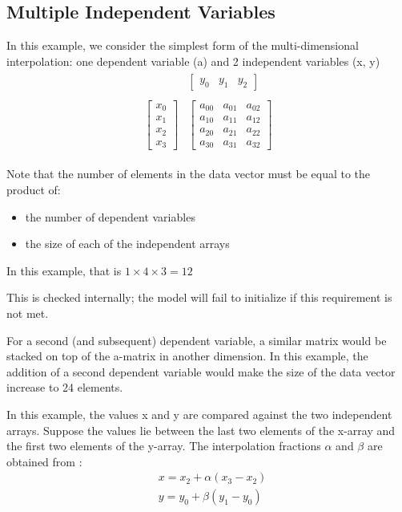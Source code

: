 \documentclass[11pt,fleqn]{report}
\begin{document}
\subsection{Multiple Independent Variables}
In this example, we consider the simplest form of the multi-dimensional
 interpolation: one dependent variable (a) and 2 independent variables (x, y)
\begin{align}
\begin{matrix}
   & \begin{bmatrix}
      y_0 & y_1 & y_2
     \end{bmatrix}
   \\
   &\\
   \begin{bmatrix}
     x_0\\x_1\\x_2\\x_3
   \end{bmatrix}
   &
   \begin{bmatrix}
     a_{00} & a_{01} & a_{02}\\
     a_{10} & a_{11} & a_{12}\\
     a_{20} & a_{21} & a_{22}\\
     a_{30} & a_{31} & a_{32}
   \end{bmatrix}
\end{matrix}
\end{align}

Note that the number of elements in the data vector must be equal to
 the product of:
\begin{itemize}
 \item the number of dependent variables
 \item the size of each of the independent arrays
\end{itemize}

In this example, that is $1 \times 4 \times 3 = 12$

This is checked
 internally; the model will fail to initialize if this requirement is not
 met.

For a second (and subsequent) dependent variable, a similar matrix would be
 stacked on top of the a-matrix in another dimension.  In this example,
 the addition of a second dependent variable
 would make the size of the data vector increase to 24 elements.

In this example, the values x and y are compared against the two independent
 arrays.  Suppose the values lie between the last two elements of the x-array
 and the first two elements of the y-array.  The interpolation fractions
$\alpha$ and $\beta$ are obtained from :
\begin{align*}
 &x = x_2 + \alpha (x_3 - x_2)
 \\
 &y = y_0 + \beta (y_1 - y_0)
\end{align*}
\end{document}
